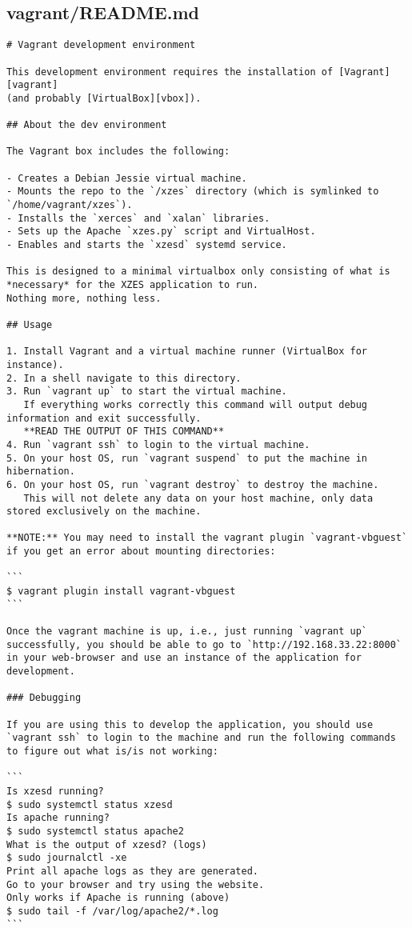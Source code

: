 \subsection{vagrant/README.md}
\begin{lstlisting}
# Vagrant development environment

This development environment requires the installation of [Vagrant][vagrant]
(and probably [VirtualBox][vbox]).

## About the dev environment

The Vagrant box includes the following:

- Creates a Debian Jessie virtual machine.
- Mounts the repo to the `/xzes` directory (which is symlinked to `/home/vagrant/xzes`).
- Installs the `xerces` and `xalan` libraries.
- Sets up the Apache `xzes.py` script and VirtualHost.
- Enables and starts the `xzesd` systemd service.

This is designed to a minimal virtualbox only consisting of what is
*necessary* for the XZES application to run.
Nothing more, nothing less.

## Usage

1. Install Vagrant and a virtual machine runner (VirtualBox for instance).
2. In a shell navigate to this directory.
3. Run `vagrant up` to start the virtual machine.
   If everything works correctly this command will output debug information and exit successfully.
   **READ THE OUTPUT OF THIS COMMAND**
4. Run `vagrant ssh` to login to the virtual machine.
5. On your host OS, run `vagrant suspend` to put the machine in hibernation.
6. On your host OS, run `vagrant destroy` to destroy the machine.
   This will not delete any data on your host machine, only data stored exclusively on the machine.

**NOTE:** You may need to install the vagrant plugin `vagrant-vbguest` if you get an error about mounting directories:

```
$ vagrant plugin install vagrant-vbguest
```

Once the vagrant machine is up, i.e., just running `vagrant up` successfully, you should be able to go to `http://192.168.33.22:8000` in your web-browser and use an instance of the application for development.

### Debugging

If you are using this to develop the application, you should use `vagrant ssh` to login to the machine and run the following commands to figure out what is/is not working:

```
Is xzesd running?
$ sudo systemctl status xzesd
Is apache running?
$ sudo systemctl status apache2
What is the output of xzesd? (logs)
$ sudo journalctl -xe
Print all apache logs as they are generated.
Go to your browser and try using the website.
Only works if Apache is running (above)
$ sudo tail -f /var/log/apache2/*.log
```


\end{lstlisting}
